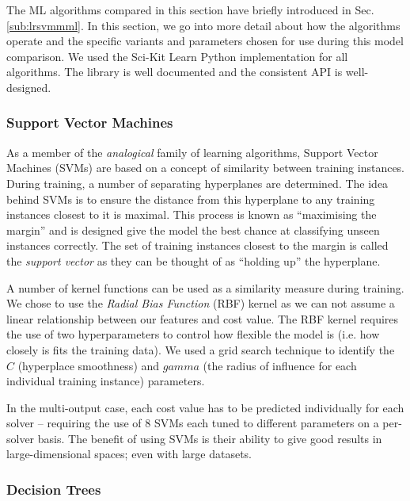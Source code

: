 The ML algorithms compared in this section have briefly introduced in Sec. \ref{sub:lrsvmmml}. 
In this section, we go into more detail about how the algorithms operate and the specific variants and parameters chosen for use during this model comparison.
We used the Sci-Kit Learn \cite{sklearn} Python implementation for all algorithms.
The library is well documented and the consistent API is well-designed. 



\subsubsection{Support Vector Machines}

As a member of the \textit{analogical} family of learning algorithms, Support Vector Machines (SVMs) \cite{svm} are based on a concept of similarity between training instances. 
During training, a number of separating hyperplanes are determined.
The idea behind SVMs is to ensure the distance from this hyperplane to any training instances closest to it is maximal.
This process is known as ``maximising the margin'' and is designed give the model the best chance at classifying unseen instances correctly. 
The set of training instances closest to the margin is called the \textit{support vector} as they can be thought of as ``holding up'' the hyperplane.

A number of kernel functions can be used as a similarity measure during training.
We chose to use the \textit{Radial Bias Function} (RBF) kernel as we can not assume a linear relationship between our features and cost value. 
The RBF kernel requires the use of two hyperparameters to control how flexible the model is (i.e. how closely is fits the training data). 
We used a grid search technique \cite{hsu2003practical} to identify the $C$ (hyperplace smoothness) and $gamma$ (the radius of influence for each individual training instance) parameters.

In the multi-output case, each cost value has to be predicted individually for each solver -- requiring the use of 8 SVMs each tuned to different parameters on a per-solver basis.
The benefit of using SVMs is their ability to give good results in large-dimensional spaces; even with large datasets. 

\subsubsection{Decision Trees}


